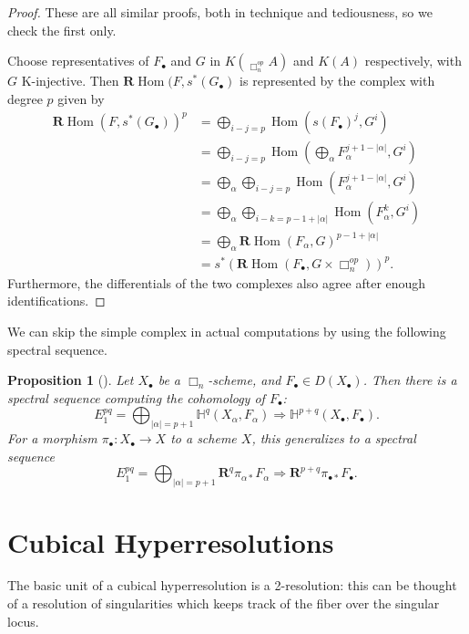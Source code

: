 \documentclass[proquest]{uwthesis}[2014/11/13]
\newtheorem{prop}[theorem]{Proposition}
\theoremstyle{definition}
\DeclareMathOperator{\Diag}{\underline{Diag}}
\DeclareMathOperator{\Hom}{Hom}
\newcommand{\HH}{\mathbb{H}}
\newcommand{\bR}{\textbf{R}}
\begin{document}
\begin{proof}
	These are all similar proofs, both in technique and tediousness, so we check the first only.
	
	Choose representatives of $F_\bullet$ and $G$ in $K(\Diag_{\Box_n^{op}} A)$ and $K(A)$ respectively, with $G$ K-injective.
	Then $\bR \Hom(F, s^* (G_\bullet)$ is represented by the complex with degree $p$ given by
	\begin{align*}
		\bR \Hom(F, s^* (G_\bullet))^p &= \bigoplus_{i-j = p} \Hom(s(F_\bullet)^j, G^i) \\
		&= \bigoplus_{i-j = p} \Hom(\bigoplus_\alpha F_\alpha^{j + 1 - |\alpha|}, G^i) \\
		&= \bigoplus_\alpha \bigoplus_{i-j = p} \Hom(F_\alpha^{j + 1 - |\alpha|}, G^i) \\
		&= \bigoplus_\alpha \bigoplus_{i-k = p - 1 + |\alpha|} \Hom(F_\alpha^k, G^i) \\
		&= \bigoplus_\alpha \bR \Hom(F_\alpha, G)^{p-1+|\alpha|} \\
		&= s^* (\bR \Hom(F_\bullet, G \times \Box_n^{op}))^p.
	\end{align*}
	Furthermore, the differentials of the two complexes also agree after enough identifications.
\end{proof}

We can skip the simple complex in actual computations by using the following spectral sequence.

\begin{prop}[{\cite[I 6.7]{Guillen1988}}]
	\label{prp:cubicalcohospecseq}
	Let $X_\bullet$ be a $\Box_n$-scheme, and $F_\bullet \in D(X_\bullet)$.
	Then there is a spectral sequence computing the cohomology of $F_\bullet$:
	\[
	E_1^{pq} = \bigoplus_{|\alpha| = p + 1} \HH^q(X_\alpha, F_\alpha) \Rightarrow \HH^{p+q}(X_\bullet, F_\bullet).
	\]
	For a morphism $\pi_\bullet : X_\bullet \rightarrow X$ to a scheme $X$, this generalizes to a spectral sequence
	\[
	E_1^{pq} = \bigoplus_{|\alpha| = p + 1} \bR^q \pi_{\alpha *}F_\alpha \Rightarrow \bR^{p+q} \pi_{\bullet *} F_\bullet.
	\]
\end{prop}

\section{Cubical Hyperresolutions}

The basic unit of a cubical hyperresolution is a 2-resolution: this can be thought of a resolution of singularities which keeps track of the fiber over the singular locus.
\end{document}
